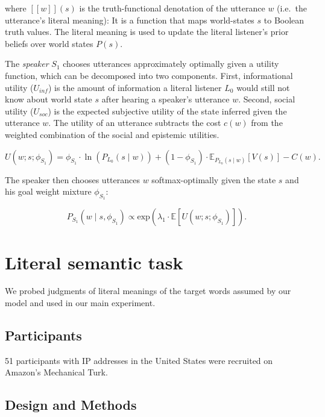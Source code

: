 \documentclass[oneside]{report}
\begin{document}
\noindent where \([\![ w ]\!](s)\) is the truth-functional denotation of
the utterance \(w\) (i.e.~the utterance's literal meaning): It is a
function that maps world-states \(s\) to Boolean truth values. The
literal meaning is used to update the literal listener's prior beliefs
over world states \(P(s)\).

The \emph{speaker} \(S_1\) chooses utterances approximately optimally
given a utility function, which can be decomposed into two components.
First, informational utility (\(U_{inf}\)) is the amount of information
a literal listener \(L_0\) would still not know about world state \(s\)
after hearing a speaker's utterance \(w\). Second, social utility
(\(U_{soc}\)) is the expected subjective utility of the state inferred
given the utterance \(w\). The utility of an utterance subtracts the
cost \(c(w)\) from the weighted combination of the social and epistemic
utilities.

\[U(w; s; \phi_{S_1}) = \phi_{S_1} \cdot \ln(P_{L_0}(s \mid w)) + (1 - \phi_{S_1}) \cdot \mathbb{E}_{P_{L_0}(s \mid w)}[V(s)] - C(w).\]

\noindent The speaker then chooses utterances \(w\) softmax-optimally
given the state \(s\) and his goal weight mixture \(\phi_{S_1}\):

\[P_{S_1}(w \mid s, \phi_{S_1}) \propto \mathrm{exp}(\lambda_{1} \cdot \mathbb{E}[U(w; s; \phi_{S_1})]).\]

\section{Literal semantic task}\label{literal-semantic-task}

We probed judgments of literal meanings of the target words assumed by
our model and used in our main experiment.

\subsection{Participants}\label{participants-5}

51 participants with IP addresses in the United States were recruited on
Amazon's Mechanical Turk.

\subsection{Design and Methods}\label{design-and-methods-1}
\end{document}
